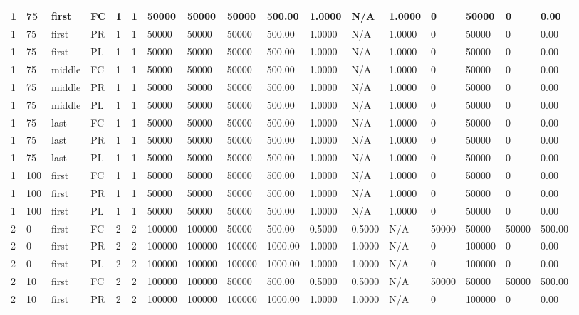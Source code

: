 \begin{tabular}{|l|l|l|l|l|l|l|l|l|l|l|l|l|l|l|l|l|}
1 & 75 & first & FC & 1 & 1 & 50000 & 50000 & 50000 & 500.00 & 1.0000 & N/A & 1.0000 & 0 & 50000 & 0 & 0.00 \\ \hline
1 & 75 & first & PR & 1 & 1 & 50000 & 50000 & 50000 & 500.00 & 1.0000 & N/A & 1.0000 & 0 & 50000 & 0 & 0.00 \\ \hline
1 & 75 & first & PL & 1 & 1 & 50000 & 50000 & 50000 & 500.00 & 1.0000 & N/A & 1.0000 & 0 & 50000 & 0 & 0.00 \\ \hline
1 & 75 & middle & FC & 1 & 1 & 50000 & 50000 & 50000 & 500.00 & 1.0000 & N/A & 1.0000 & 0 & 50000 & 0 & 0.00 \\ \hline
1 & 75 & middle & PR & 1 & 1 & 50000 & 50000 & 50000 & 500.00 & 1.0000 & N/A & 1.0000 & 0 & 50000 & 0 & 0.00 \\ \hline
1 & 75 & middle & PL & 1 & 1 & 50000 & 50000 & 50000 & 500.00 & 1.0000 & N/A & 1.0000 & 0 & 50000 & 0 & 0.00 \\ \hline
1 & 75 & last & FC & 1 & 1 & 50000 & 50000 & 50000 & 500.00 & 1.0000 & N/A & 1.0000 & 0 & 50000 & 0 & 0.00 \\ \hline
1 & 75 & last & PR & 1 & 1 & 50000 & 50000 & 50000 & 500.00 & 1.0000 & N/A & 1.0000 & 0 & 50000 & 0 & 0.00 \\ \hline
1 & 75 & last & PL & 1 & 1 & 50000 & 50000 & 50000 & 500.00 & 1.0000 & N/A & 1.0000 & 0 & 50000 & 0 & 0.00 \\ \hline
1 & 100 & first & FC & 1 & 1 & 50000 & 50000 & 50000 & 500.00 & 1.0000 & N/A & 1.0000 & 0 & 50000 & 0 & 0.00 \\ \hline
1 & 100 & first & PR & 1 & 1 & 50000 & 50000 & 50000 & 500.00 & 1.0000 & N/A & 1.0000 & 0 & 50000 & 0 & 0.00 \\ \hline
1 & 100 & first & PL & 1 & 1 & 50000 & 50000 & 50000 & 500.00 & 1.0000 & N/A & 1.0000 & 0 & 50000 & 0 & 0.00 \\ \hline
2 & 0 & first & FC & 2 & 2 & 100000 & 100000 & 50000 & 500.00 & 0.5000 & 0.5000 & N/A & 50000 & 50000 & 50000 & 500.00 \\ \hline
2 & 0 & first & PR & 2 & 2 & 100000 & 100000 & 100000 & 1000.00 & 1.0000 & 1.0000 & N/A & 0 & 100000 & 0 & 0.00 \\ \hline
2 & 0 & first & PL & 2 & 2 & 100000 & 100000 & 100000 & 1000.00 & 1.0000 & 1.0000 & N/A & 0 & 100000 & 0 & 0.00 \\ \hline
2 & 10 & first & FC & 2 & 2 & 100000 & 100000 & 50000 & 500.00 & 0.5000 & 0.5000 & N/A & 50000 & 50000 & 50000 & 500.00 \\ \hline
2 & 10 & first & PR & 2 & 2 & 100000 & 100000 & 100000 & 1000.00 & 1.0000 & 1.0000 & N/A & 0 & 100000 & 0 & 0.00 \\ \hline

\end{tabular}
